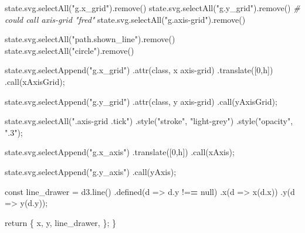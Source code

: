 \documentclass[print]{nuthesis}
\newenvironment{Shaded}{\begin{snugshade}}{\end{snugshade}}
\newcommand{\AttributeTok}[1]{\textcolor[rgb]{0.77,0.63,0.00}{#1}}
\newcommand{\CommentTok}[1]{\textcolor[rgb]{0.56,0.35,0.01}{\textit{#1}}}
\newcommand{\DecValTok}[1]{\textcolor[rgb]{0.00,0.00,0.81}{#1}}
\newcommand{\ErrorTok}[1]{\textcolor[rgb]{0.64,0.00,0.00}{\textbf{#1}}}
\newcommand{\FunctionTok}[1]{\textcolor[rgb]{0.00,0.00,0.00}{#1}}
\newcommand{\NormalTok}[1]{#1}
\newcommand{\OtherTok}[1]{\textcolor[rgb]{0.56,0.35,0.01}{#1}}
\newcommand{\SpecialCharTok}[1]{\textcolor[rgb]{0.00,0.00,0.00}{#1}}
\newcommand{\StringTok}[1]{\textcolor[rgb]{0.31,0.60,0.02}{#1}}
\begin{document}
\begin{Shaded}
\begin{Highlighting}[]
  \FunctionTok{state.svg.selectAll}\NormalTok{(}\StringTok{"g.x\_grid"}\NormalTok{)}\FunctionTok{.remove}\NormalTok{()}
  \FunctionTok{state.svg.selectAll}\NormalTok{(}\StringTok{"g.y\_grid"}\NormalTok{)}\FunctionTok{.remove}\NormalTok{()}
  \CommentTok{\# could call axis{-}grid "fred"}
  \FunctionTok{state.svg.selectAll}\NormalTok{(}\StringTok{"g.axis{-}grid"}\NormalTok{)}\FunctionTok{.remove}\NormalTok{()}
  
  \FunctionTok{state.svg.selectAll}\NormalTok{(}\StringTok{"path.shown\_line"}\NormalTok{)}\FunctionTok{.remove}\NormalTok{()}
  \FunctionTok{state.svg.selectAll}\NormalTok{(}\StringTok{"circle"}\NormalTok{)}\FunctionTok{.remove}\NormalTok{()}
  
  \FunctionTok{state.svg.selectAppend}\NormalTok{(}\StringTok{"g.x\_grid"}\NormalTok{)}
  \FunctionTok{.attr}\NormalTok{(}\StringTok{\textquotesingle{}class\textquotesingle{}}\NormalTok{, }\StringTok{\textquotesingle{}x axis{-}grid\textquotesingle{}}\NormalTok{)}
  \FunctionTok{.translate}\NormalTok{([}\DecValTok{0}\NormalTok{,h])}
  \FunctionTok{.call}\NormalTok{(xAxisGrid);}
  
  \FunctionTok{state.svg.selectAppend}\NormalTok{(}\StringTok{"g.y\_grid"}\NormalTok{)}
  \FunctionTok{.attr}\NormalTok{(}\StringTok{\textquotesingle{}class\textquotesingle{}}\NormalTok{, }\StringTok{\textquotesingle{}y axis{-}grid\textquotesingle{}}\NormalTok{)}
  \FunctionTok{.call}\NormalTok{(yAxisGrid);}
  
  \FunctionTok{state.svg.selectAll}\NormalTok{(}\StringTok{".axis{-}grid .tick"}\NormalTok{)}
  \FunctionTok{.style}\NormalTok{(}\StringTok{"stroke"}\NormalTok{, }\StringTok{"light{-}grey"}\NormalTok{)}
  \FunctionTok{.style}\NormalTok{(}\StringTok{"opacity"}\NormalTok{, }\StringTok{".3"}\NormalTok{);}
  
  \FunctionTok{state.svg.selectAppend}\NormalTok{(}\StringTok{"g.x\_axis"}\NormalTok{)}
  \FunctionTok{.translate}\NormalTok{([}\DecValTok{0}\NormalTok{,h])}
  \FunctionTok{.call}\NormalTok{(xAxis);}
  
  \FunctionTok{state.svg.selectAppend}\NormalTok{(}\StringTok{"g.y\_axis"}\NormalTok{)}
  \FunctionTok{.call}\NormalTok{(yAxis);}
  
\NormalTok{  const line\_drawer }\OtherTok{=} \FunctionTok{d3.line}\NormalTok{()}
  \FunctionTok{.defined}\NormalTok{(}\AttributeTok{d =}\SpecialCharTok{\textgreater{}}\NormalTok{ d.y }\SpecialCharTok{!=}\ErrorTok{=}\NormalTok{ null)}
  \FunctionTok{.x}\NormalTok{(}\AttributeTok{d =}\SpecialCharTok{\textgreater{}} \FunctionTok{x}\NormalTok{(d.x))}
  \FunctionTok{.y}\NormalTok{(}\AttributeTok{d =}\SpecialCharTok{\textgreater{}} \FunctionTok{y}\NormalTok{(d.y));}
  
\NormalTok{  return \{}
\NormalTok{    x,}
\NormalTok{    y,}
\NormalTok{    line\_drawer,}
\NormalTok{  \};}
\NormalTok{\}}
\end{Highlighting}
\end{Shaded}
\end{document}
